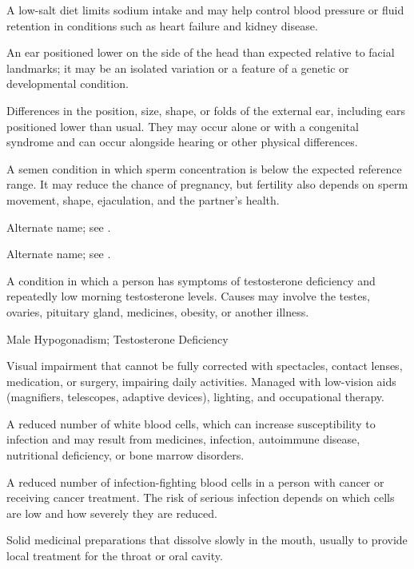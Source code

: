  A low-salt diet limits sodium intake and may help control blood pressure or fluid retention in conditions such as heart failure and kidney disease.

 An ear positioned lower on the side of the head than expected relative to facial landmarks; it may be an isolated variation or a feature of a genetic or developmental condition.

 Differences in the position, size, shape, or folds of the external ear, including ears positioned lower than usual. They may occur alone or with a congenital syndrome and can occur alongside hearing or other physical differences.

 A semen condition in which sperm concentration is below the expected reference range. It may reduce the chance of pregnancy, but fertility also depends on sperm movement, shape, ejaculation, and the partner's health.

 Alternate name; see .

 Alternate name; see .

 A condition in which a person has symptoms of testosterone deficiency and repeatedly low morning testosterone levels. Causes may involve the testes, ovaries, pituitary gland, medicines, obesity, or another illness.

\synonyms
Male Hypogonadism; Testosterone Deficiency

 Visual impairment that cannot be fully corrected with spectacles, contact lenses,
medication, or surgery, impairing daily activities. Managed with low-vision aids
(magnifiers, telescopes, adaptive devices), lighting, and occupational therapy.

 A reduced number of white blood cells, which can increase susceptibility to infection and may result from medicines, infection, autoimmune disease, nutritional deficiency, or bone marrow disorders.

 A reduced number of infection-fighting blood cells in a person with cancer or receiving cancer treatment. The risk of serious infection depends on which cells are low and how severely they are reduced.

 Solid medicinal preparations that dissolve slowly in the mouth, usually to provide local treatment for the throat or oral cavity.


